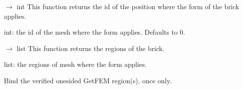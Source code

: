 \documentclass[letterpaper,10pt,english]{sphinxmanual}
\begin{document}
\begin{fulllineitems}
\begin{fulllineitems}
\begin{description}
\end{description}

\end{fulllineitems}


\begin{fulllineitems}
\label{\detokenize{scrimp:scrimp.brick.Brick.get_position}}
\pysigstartsignatures
\pysiglinewithargsret
{}
{}
{{ $\rightarrow$ int}}
\pysigstopsignatures
\sphinxAtStartPar
This function returns the id of the position where the form of the brick applies.
\begin{description}
\sphinxAtStartPar
int: the id of the mesh where the form applies. Defaults to 0.

\end{description}

\end{fulllineitems}


\begin{fulllineitems}
\label{\detokenize{scrimp:scrimp.brick.Brick.get_regions}}
\pysigstartsignatures
\pysiglinewithargsret
{}
{}
{{ $\rightarrow$ list}}
\pysigstopsignatures
\sphinxAtStartPar
This function returns the regions of the brick.
\begin{description}
\sphinxAtStartPar
list: the regions of mesh where the form applies.

\end{description}

\end{fulllineitems}


\begin{fulllineitems}
\label{\detokenize{scrimp:scrimp.brick.Brick.set_assembly_regions}}
\pysigstartsignatures
\pysiglinewithargsret
{}
{}
{}
\pysigstopsignatures
\sphinxAtStartPar
Bind the verified one\sphinxhyphen{}sided GetFEM region(s), once only.

\end{fulllineitems}


\end{fulllineitems}
\end{document}
